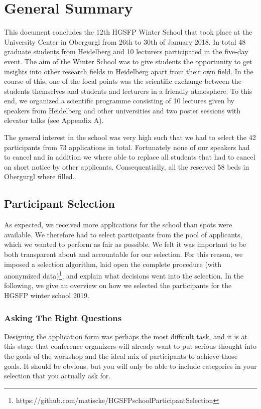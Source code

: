 \section*{General Summary}
This document concludes the 12th HGSFP Winter School that took place at
the University Center in Obergurgl from 26th to 30th of January 2018. In
total 48 graduate students from Heidelberg and 10 lecturers participated
in the five-day event. The aim of the Winter School was to give students
the opportunity to get insights into other research fields in
Heidelberg apart from their own field. In the course of this, one of the
focal points was the scientific exchange between the students
themselves and students and lecturers in a friendly atmosphere. To this
end, we organized a scientific programme consisting of 10 lectures given
by speakers from Heidelberg and other universities and two poster
sessions with elevator talks (see Appendix A).

The general interest in the school was very high such that we had to
select the 42 participants from 73 applications in total.
Fortunately none of our speakers had to cancel and in addition we where
able to replace all students that had to cancel on short notice by other
applicants. Consequentially, all the reserved 58 beds in Obergurgl where
filled.

\subsection*{Participant Selection}
As expected, we received more applications for the school than spots were available. We therefore had to select participants from the pool of applicants, which we wanted to perform as fair as possible. We felt it was important to be both transparent about and accountable for our selection. For this reason, we imposed a selection algorithm, laid open the complete procedure (with anonymized data)\footnote{https://github.com/matiscke/HGSFPschoolParticipantSelection}, and explain what decisions went into the selection. In the following, we give an overview on how we selected the participants for the HGSFP winter school 2019.

\subsubsection*{Asking The Right Questions}
Designing the application form was perhaps the most difficult task, and it is at this stage that conference organizers will already want to put serious thought into the goals of the workshop and the ideal mix of participants to achieve those goals. It should be obvious, but you will only be able to include categories in your selection that you actually ask for.

